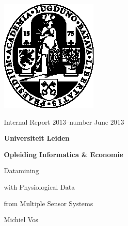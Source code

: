 \documentclass[12pt]{article}
\begin{document}
\thispagestyle{empty}

\begin{large}

\vspace*{4mm}\hspace*{-13mm}\includegraphics{ullogo.eps}

\vspace*{-3.5cm}

\sf 

\hspace*{2.5cm}Internal Report 2013--number \hfill June 2013

\vspace*{5mm}

\begin{Huge}
\hspace*{2.5cm}\textbf{Universiteit Leiden}

\vspace*{8mm}

\hspace*{2.5cm}\textbf{Opleiding Informatica \& Economie}
\end{Huge}

\vspace*{4.5cm}

\begin{Large}
\hfill Datamining 

\vspace*{3mm}

\hfill with Physiological Data

\vspace*{3mm}

\hfill from Multiple Sensor Systems

\vspace*{4cm}

\hfill Michiel Vos

\end{Large}


\end{large}
\end{document}
